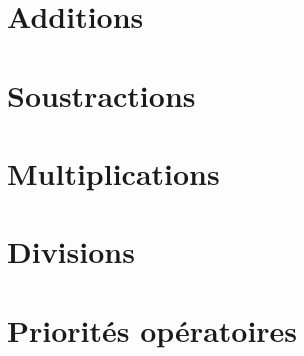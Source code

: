 \documentclass[12pt]{article}
\begin{document}








\section{Additions}

\section{Soustractions}

\section{Multiplications}

\section{Divisions}

\section{Priorités opératoires}


\section*{}

\end{document}
